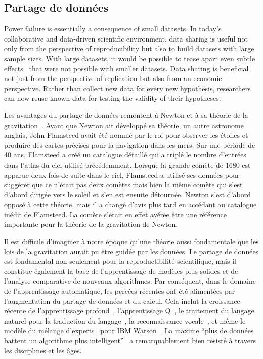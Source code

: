 \subsection*{Partage de données}
\label{sec:sommaire:intro_datasharing}
Power failure is essentially a consequence of small datasets. In today's collaborative and data-driven scientific environment, data sharing is useful not only from the perspective of reproducibility but also to build datasets with large sample sizes. With large datasets, it would be possible to tease apart even subtle effects~\citep{smith2017statistical} that were not possible with smaller datasets. Data sharing is beneficial not just from the perspective of replication but also from an economic perspective. Rather than collect new data for every new hypothesis, researchers can now reuse known data for testing the validity of their hypotheses.

Les avantages du partage de données remontent à Newton et à sa théorie de la gravitation~\citep{pointofview2013}. Avant que Newton ait développé sa théorie, un autre astronome anglais, John Flamsteed avait été nommé par le roi pour observer les étoiles et produire des cartes précises pour la navigation dans les mers. Sur une période de 40 ans, Flamsteed a créé un catalogue détaillé qui a triplé le nombre d'entrées dans l'atlas du ciel utilisé précédemment. Lorsque la grande comète de 1680 est apparue deux fois de suite dans le ciel, Flamsteed a utilisé ses données pour suggérer que ce n'était pas deux comètes mais bien la même comète qui s'est d'abord dirigée vers le soleil et s'en est ensuite détournée. Newton s'est d'abord opposé à cette théorie, mais il a changé d'avis plus tard en accédant au catalogue inédit de Flamsteed. La comète s'était en effet avérée être une référence importante pour la théorie de la gravitation de Newton.

Il est difficile d'imaginer à notre époque qu'une théorie aussi fondamentale que les lois de la gravitation aurait pu être guidée par les données. Le partage de données est fondamental non seulement pour la reproductibilité scientifique, mais il constitue également la base de l'apprentissage de modèles plus solides et de l'analyse comparative de nouveaux algorithmes. Par conséquent, dans le domaine de l'apprentissage automatique, les percées récentes ont été alimentées par l'augmentation du partage de données et du calcul. Cela inclut la croissance récente de l'apprentissage profond~\citep{deng2009imagenet}, l'apprentissage Q~\citep{watkins1992q, bellemare2013arcade}, le traitement du langage naturel pour la traduction du langage~\citep{halevy2009unreasonable}, la reconnaissance vocale~\citep{paul1992design}, et même le modèle du mélange d'experts~\citep{jacobs1991adaptive} pour IBM Watson~\citep{ferrucci2010building}. La maxime ``plus de données battent un algorithme plus intelligent''~\citep{domingos2012few} a remarquablement bien résisté à travers les disciplines et les âges.

